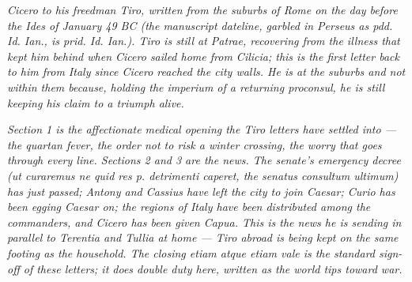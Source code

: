 
\textit{Cicero to his freedman Tiro, written from the
suburbs of Rome on the day before the Ides of January
49 BC (the manuscript dateline, garbled in Perseus as
\textit{pdd. Id. Ian.}, is \textit{prid. Id. Ian.}).
Tiro is still at Patrae, recovering from the illness
that kept him behind when Cicero sailed home from
Cilicia; this is the first letter back to him from
Italy since Cicero reached the city walls. He is at
the suburbs and not within them because, holding the
\textit{imperium} of a returning proconsul, he is
still keeping his claim to a triumph alive.}

\textit{Section 1 is the affectionate medical opening
the Tiro letters have settled into --- the quartan
fever, the order not to risk a winter crossing, the
worry that goes through every line. Sections 2 and 3
are the news. The senate's emergency decree
(\textit{ut curaremus ne quid res p. detrimenti
caperet}, the \textit{senatus consultum ultimum}) has
just passed; Antony and Cassius have left the city to
join Caesar; Curio has been egging Caesar on; the
regions of Italy have been distributed among the
commanders, and Cicero has been given Capua. This is
the news he is sending in parallel to Terentia and
Tullia at home --- Tiro abroad is being kept on the
same footing as the household. The closing
\textit{etiam atque etiam vale} is the standard sign-off
of these letters; it does double duty here, written as
the world tips toward war.}

